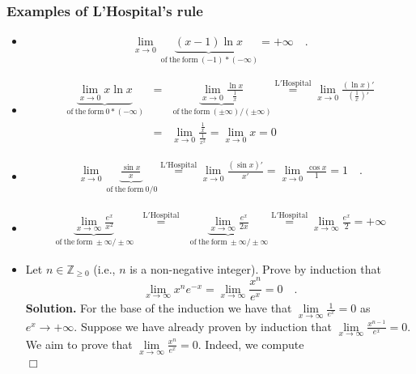 \documentclass[12pt]{book}
\newenvironment{solution}{\textbf{Solution.} }{$\Box$}
\begin{document}
\begin{itemize}
\subsubsection{Examples of L'Hospital's rule}
\begin{itemize}
\item 
\[
\lim\limits_{x\to 0} \underbrace{(x-1)\ln x}_{\mathrm{~of~the~form~}(-1)*(-\infty)} =+\infty\quad .
\]
\item 
\[\begin{array}{rcl}
\underbrace{\lim\limits_{x\to 0} x\ln x}_{\mathrm{~of~the~form~}0*(-\infty)} &=&\underbrace{\lim\limits_{x\to 0} \frac{\ln x}{\frac{1}{x}}}_{\mathrm{~of~the~form~}(\pm\infty)/(\pm\infty)}\stackrel{\mathrm{L'Hospital}}{=}\lim\limits_{x\to 0} \frac{(\ln x)'}{\left(\frac{1}{x}\right)'}\\&=& \lim\limits_{x\to 0} \frac{\frac{1}{x}}{\frac{1}{x^2}}=  \lim\limits_{x\to 0} x =0
\end{array}
\]
\item 
\[
\begin{array}{rcl}
\lim\limits_{x\to 0} \underbrace{\frac{\sin x}x}_{\mathrm{~of~the~form~}0/0}\stackrel{\mathrm{L'Hospital}}{=} \lim\limits_{x\to 0} \frac{(\sin x)'}{x'}= \lim\limits_{x\to 0} \frac{\cos x}{1}= 1\quad .
\end{array}
\]
\item 
\[
\begin{array}{rcl}
\underbrace{\lim\limits_{x\to \infty} \frac{e^x}{x^2}}_{\mathrm{~of~the~form~}\pm \infty/\pm\infty} &\stackrel{\mathrm{L'Hospital}}{=} & \underbrace{\lim\limits_{x\to \infty} \frac{e^x}{2x}}_{\mathrm{~of~the~form~}\pm \infty/\pm\infty}\stackrel{\mathrm{L'Hospital}}{=}\lim\limits_{x\to \infty} \frac{e^x}{2}= +\infty
\end{array}
\]
\item Let $n\in \mathbb Z_{\geq 0}$ (i.e., $n$ is a non-negative integer). Prove by induction that 
\begin{equation}\label{eqLimiteMinusXtimesxtoNth}
\lim\limits_{x\to \infty} x^ne^{-x} = \lim\limits_{x\to \infty}\frac{ x^n}{e^{x}}=0\quad .
\end{equation}
\begin{solution}
For the base of the induction we have that $\lim\limits_{x\to \infty}\frac{1}{e^{x}}=0$ as $e^x\to +\infty$. Suppose we have already proven by induction that $ \lim\limits_{x\to \infty}\frac{x^{n-1}}{e^{x}}=0$. We aim to prove that $ \lim\limits_{x\to \infty}\frac{x^{n}}{e^{x}}=0$. Indeed, we compute
\[
\begin{array}{rcl}

\end{array}\]
\end{solution}
\end{itemize}
\end{itemize}
\end{document}
